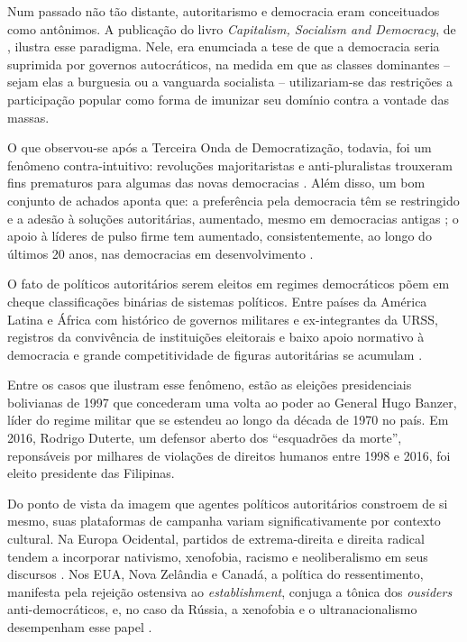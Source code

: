 \documentclass[
12pt,				%
openright,			%
twoside,			%
a4paper,			%
english,			%
french,				%
spanish,			%
brazil				%
]{abntex2}
\begin{document}
Num passado não tão distante, autoritarismo e democracia eram conceituados como antônimos. A publicação do livro \emph{Capitalism, Socialism and Democracy}, de , ilustra esse paradigma. Nele, era enumciada a tese de que a democracia seria suprimida por governos autocráticos, na medida em que  as classes dominantes -- sejam elas a burguesia ou a vanguarda socialista -- utilizariam-se das restrições a participação popular como forma de imunizar seu domínio contra a vontade das massas. 

O que observou-se após a Terceira Onda de Democratização, todavia, foi um fenômeno contra-intuitivo: revoluções majoritaristas e anti-pluralistas trouxeram fins prematuros para algumas das novas democracias \cite{lipset1993reflections}. Além disso, um bom conjunto de achados aponta que: a preferência pela democracia têm se restringido e a adesão à soluções autoritárias, aumentado, mesmo em democracias antigas \cite{foa2016democratic, foa2017signs, foa2017end}; o apoio à líderes de pulso firme tem aumentado, consistentemente, ao longo do últimos 20 anos, nas democracias em desenvolvimento \cite{voeten2016people}.

O fato de políticos autoritários serem eleitos em regimes democráticos põem em cheque classificações binárias de sistemas políticos. Entre países da América Latina e África com histórico de governos militares e ex-integrantes da URSS, registros da convivência de instituições eleitorais e baixo apoio normativo à democracia e grande competitividade de figuras autoritárias se acumulam \cite{booth1984political,seligson2003democracies, seligson2005feeding}. 

Entre os casos que ilustram esse fenômeno, estão as eleições presidenciais bolivianas de 1997 que concederam uma volta ao poder ao General Hugo Banzer, líder do regime militar que se estendeu ao longo da década de 1970 no país. Em 2016, Rodrigo Duterte, um defensor aberto dos ``esquadrões da morte'', reponsáveis por milhares de violações de direitos humanos entre 1998 e 2016, foi eleito presidente das Filipinas. 

Do ponto de vista da imagem que agentes políticos autoritários constroem de si mesmo, suas plataformas de campanha variam significativamente por contexto cultural. Na Europa Ocidental, partidos de extrema-direita e direita radical tendem a incorporar nativismo, xenofobia, racismo e neoliberalismo em seus discursos \cite{mudde2009populist}. Nos EUA, Nova Zelândia e Canadá, a política do ressentimento, manifesta pela rejeição ostensiva ao \emph{establishment}, conjuga a tônica dos \emph{ousiders} anti-democráticos, e, no caso da Rússia, a xenofobia e o ultranacionalismo desempenham esse papel \cite{norris2005radical}. 
\end{document}
